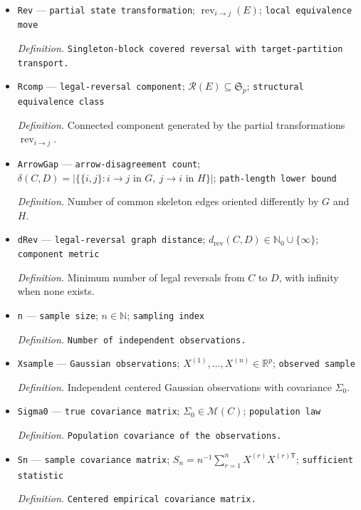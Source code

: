 \documentclass{article}
\begin{document}
\begin{itemize}
  \item \texttt{Rev} --- \texttt{partial state transformation}; \(\operatorname{rev}_{i\to j}(E)\); \texttt{local equivalence move}
  \par\smallskip\noindent\emph{Definition.} \texttt{Singleton-\allowbreak{}block covered reversal with target-\allowbreak{}partition transport.}
  \item \texttt{Rcomp} --- \texttt{legal-\allowbreak{}reversal component}; \(\mathcal R(E)\subseteq\mathfrak S_p\); \texttt{structural equivalence class}
  \par\smallskip\noindent\emph{Definition.} Connected component generated by the partial transformations \(\operatorname{rev}_{i\to j}\).
  \item \texttt{ArrowGap} --- \texttt{arrow-\allowbreak{}disagreement count}; \(\delta(C,D)=|\{\{i,j\}:i\to j\text{ in }G,\ j\to i\text{ in }H\}|\); \texttt{path-\allowbreak{}length lower bound}
  \par\smallskip\noindent\emph{Definition.} Number of common skeleton edges oriented differently by \(G\) and \(H\).
  \item \texttt{dRev} --- \texttt{legal-\allowbreak{}reversal graph distance}; \(d_{\mathrm{rev}}(C,D)\in\mathbb N_0\cup\{\infty\}\); \texttt{component metric}
  \par\smallskip\noindent\emph{Definition.} Minimum number of legal reversals from \(C\) to \(D\), with infinity when none exists.
  \item \texttt{n} --- \texttt{sample size}; \(n\in\mathbb N\); \texttt{sampling index}
  \par\smallskip\noindent\emph{Definition.} \texttt{Number of independent observations.}
  \item \texttt{Xsample} --- \texttt{Gaussian observations}; \(X^{(1)},\ldots,X^{(n)}\in\mathbb R^p\); \texttt{observed sample}
  \par\smallskip\noindent\emph{Definition.} Independent centered Gaussian observations with covariance \(\Sigma_0\).
  \item \texttt{Sigma0} --- \texttt{true covariance matrix}; \(\Sigma_0\in\mathcal M(C)\); \texttt{population law}
  \par\smallskip\noindent\emph{Definition.} \texttt{Population covariance of the observations.}
  \item \texttt{Sn} --- \texttt{sample covariance matrix}; \(S_n=n^{-1}\sum_{r=1}^nX^{(r)}X^{(r)\mathsf T}\); \texttt{sufficient statistic}
  \par\smallskip\noindent\emph{Definition.} \texttt{Centered empirical covariance matrix.}

\end{itemize}
\end{document}
